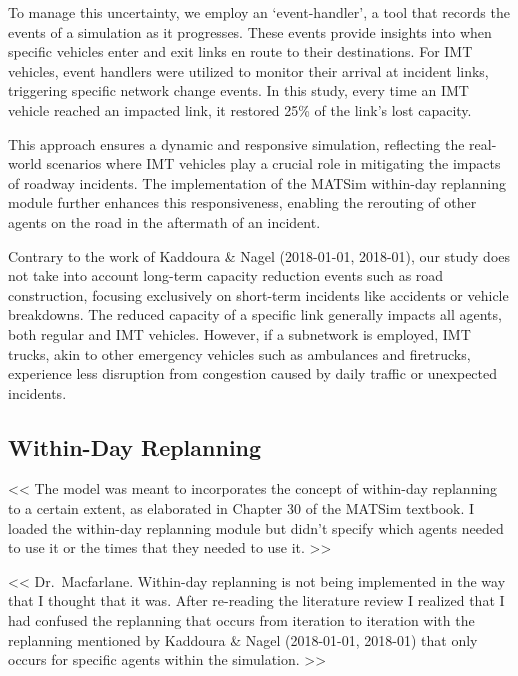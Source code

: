 \documentclass[fancy, oneside, mastersfancy, ms]{byuthesis}
\begin{document}
To manage this uncertainty, we employ an `event-handler', a tool that
records the events of a simulation as it progresses. These events
provide insights into when specific vehicles enter and exit links en
route to their destinations. For IMT vehicles, event handlers were
utilized to monitor their arrival at incident links, triggering specific
network change events. In this study, every time an IMT vehicle reached
an impacted link, it restored 25\% of the link's lost capacity.

This approach ensures a dynamic and responsive simulation, reflecting
the real-world scenarios where IMT vehicles play a crucial role in
mitigating the impacts of roadway incidents. The implementation of the
MATSim within-day replanning module further enhances this
responsiveness, enabling the rerouting of other agents on the road in
the aftermath of an incident.

Contrary to the work of Kaddoura \& Nagel (2018-01-01, 2018-01), our
study does not take into account long-term capacity reduction events
such as road construction, focusing exclusively on short-term incidents
like accidents or vehicle breakdowns. The reduced capacity of a specific
link generally impacts all agents, both regular and IMT vehicles.
However, if a subnetwork is employed, IMT trucks, akin to other
emergency vehicles such as ambulances and firetrucks, experience less
disruption from congestion caused by daily traffic or unexpected
incidents.

\hypertarget{within-day-replanning}{%
\subsection{Within-Day Replanning}\label{within-day-replanning}}

\textless\textless{} The model was meant to incorporates the concept of
within-day replanning to a certain extent, as elaborated in Chapter 30
of the MATSim textbook. I loaded the within-day replanning module but
didn't specify which agents needed to use it or the times that they
needed to use it. \textgreater\textgreater{}

\textless\textless{} Dr.~Macfarlane. Within-day replanning is not being
implemented in the way that I thought that it was. After re-reading the
literature review I realized that I had confused the replanning that
occurs from iteration to iteration with the replanning mentioned by
Kaddoura \& Nagel (2018-01-01, 2018-01) that only occurs for specific
agents within the simulation. \textgreater\textgreater{}
\end{document}
